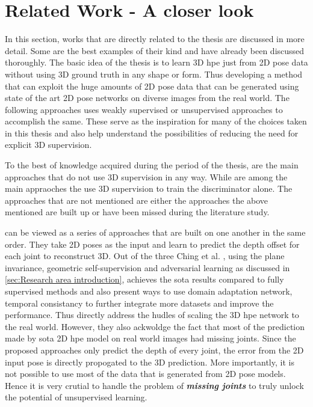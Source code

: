 
\section{Related Work - A closer look}
\label{section:Related Work}

In this section, works that are directly related to the thesis are discussed in more detail. Some are the best examples of their kind and have already been discussed thoroughly. The basic idea of the thesis is to learn 3D \ac{hpe} just from 2D pose data without using 3D ground truth in any shape or form. Thus developing a method that can exploit the huge amounts of 2D pose data that can be generated using state of the art 2D pose networks on diverse images from the real world. The following approaches uses weakly supervised or unsupervised approaches to accomplish the same. These serve as the inspiration for many of the choices taken in this thesis and also help understand the possibilities of reducing the need for explicit 3D supervision.

To the best of knowledge acquired during the period of the thesis, \cite{can3dpose, amazon1, unsupervisedAdversarial, c3dpo} are the main approaches that do not use 3D supervision in any way. While \cite{repnet, weaklymultiple} are among the main appraoches the use 3D supervision to train the discriminator alone. The approaches that are not mentioned are either the approaches the above mentioned are built up or have been missed during the literature study.

\cite{unsupervisedAdversarial, can3dpose, amazon1} can be viewed as a series of approaches that are built on one another in the same order. They take 2D poses as the input and learn to predict the depth offset for each joint to reconstruct 3D. Out of the three Ching et al. \cite{amazon1}, using the plane invariance, geometric self-supervision and adversarial learning as discussed in \ref{sec:Research area introduction}, achieves the \ac{sota} results compared to fully supervised methods and also present ways to use domain adaptation network, temporal consistancy to further integrate more datasets and improve the performance. Thus directly address the hudles of scaling the 3D \ac{hpe} network to the real world. However, they also ackwoldge the fact that most of the prediction made by \ac{sota} 2D \ac{hpe} model on real world images had missing joints. Since the proposed approaches only predict the depth of every joint, the error from the 2D input pose is directly propogated to the 3D prediction. More importantly, it is not possible to use most of the data that is generated from 2D pose models. Hence it is very crutial to handle the problem of \textit{\textbf{missing joints}} to truly unlock the potential of unsupervised learning. 

